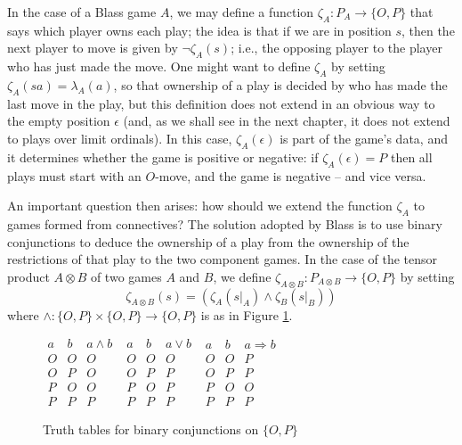 \documentclass[11pt]{article} %
\theoremstyle{plain} %
\theoremstyle{definition} %
\theoremstyle{note}
\theoremstyle{exercisestyle}
\newcommand*\from{\colon}
\newcommand{\cmap}[3]{#1\from{}#2\to{}#3}
\newcommand{\tensor}{\otimes}
\newcommand{\OP}{\{O,P\}}
\newcommand{\emptyplay}{\epsilon}
\begin{document}
In the case of a Blass game $A$, we may define a function $\zeta_A\colon P_A\to\OP$ that says which player owns each play; the idea is that if we are in position $s$, then the next player to move is given by $\neg\zeta_A(s)$; i.e., the opposing player to the player who has just made the move.  One might want to define $\zeta_A$ by setting $\zeta_A(sa)=\lambda_A(a)$, so that ownership of a play is decided by who has made the last move in the play, but this definition does not extend in an obvious way to the empty position $\emptyplay$ (and, as we shall see in the next chapter, it does not extend to plays over limit ordinals).  In this case, $\zeta_A(\emptyplay)$ is part of the game's data, and it determines whether the game is positive or negative: if $\zeta_A(\emptyplay) = P$ then all plays must start with an $O$-move, and the game is negative -- and vice versa.

An important question then arises: how should we extend the function $\zeta_A$ to games formed from connectives?  The solution adopted by Blass is to use binary conjunctions to deduce the ownership of a play from the ownership of the restrictions of that play to the two component games.  In the case of the tensor product $A\tensor B$ of two games $A$ and $B$, we define $\cmap{\zeta_{A\tensor B}}{P_{A\tensor B}}{\OP}$ by setting
\[
  \zeta_{A\tensor B}(s) = (\zeta_A(s\vert_A) \wedge \zeta_B(s\vert_B))
  \]
where $\cmap{\wedge}{\OP\times \OP}{\OP}$ is as in Figure \ref{truthtables}.

\begin{figure}[h]
  \begin{center}
    $\begin{array}{cc|c}
      a & b & a \wedge b \\
      \hline
      O & O & O \\
      O & P & O \\
      P & O & O \\
      P & P & P
    \end{array}$
    \quad
    $\begin{array}{cc|c}
      a & b & a \vee b \\
      \hline
      O & O & O \\
      O & P & P \\
      P & O & P \\
      P & P & P
    \end{array}$
    \quad
    $\begin{array}{cc|c}
      a & b & a \Rightarrow b \\
      \hline
      O & O & P \\
      O & P & P \\
      P & O & O \\
      P & P & P
    \end{array}$
    \caption{Truth tables for binary conjunctions on $\OP$}
    \label{truthtables}
  \end{center}
\end{figure}
\end{document}
